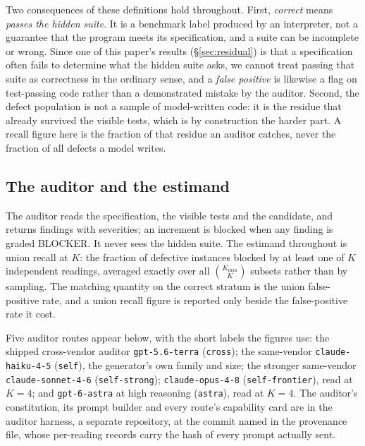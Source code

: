 Two consequences of these definitions hold throughout. First, \emph{correct} means \emph{passes the
hidden suite}. It is a benchmark label produced by an interpreter, not a guarantee that the
program meets its specification, and a suite can be incomplete or wrong. Since one of this paper's
results (\S\ref{sec:residual}) is that a specification often fails to determine what the hidden suite asks, we
cannot treat passing that suite as correctness in the ordinary sense, and a \emph{false positive}
is likewise a flag on test-passing code rather than a demonstrated mistake by the auditor. Second, the
defect population is not a sample of model-written code: it is the residue that already survived
the visible tests, which is by construction the harder part. A recall figure here is the fraction
of that residue an auditor catches, never the fraction of all defects a model writes.

\subsection{The auditor and the estimand}

The auditor reads the specification, the visible tests and the candidate, and returns findings
with severities; an increment is blocked when any finding is graded BLOCKER. It never sees the
hidden suite. The estimand throughout is union recall at $K$: the fraction of defective
instances blocked by at least one of $K$ independent readings, averaged exactly over all
$\binom{K_{\max}}{K}$ subsets rather than by sampling. The matching quantity on the correct stratum
is the union false-positive rate, and a union recall figure is reported only beside the
false-positive rate it cost.

Five auditor routes appear below, with the short labels the figures use: the shipped cross-vendor
auditor \texttt{gpt-5.6-terra} (\texttt{cross}); the same-vendor \texttt{claude-haiku-4-5}
(\texttt{self}), the generator's own family and size; the stronger same-vendor
\texttt{claude-sonnet-4-6} (\texttt{self-strong}); \texttt{claude-opus-4-8}
(\texttt{self-frontier}), read at $K=4$; and \texttt{gpt-6-astra} at high reasoning
(\texttt{astra}), read at $K=4$. The auditor's constitution, its prompt
builder and every route's capability card are in the auditor harness, a separate repository, at
the commit named in the provenance file, whose per-reading records carry the hash of every prompt
actually sent.

